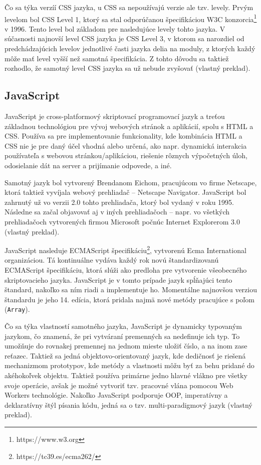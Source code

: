 Čo sa týka verzíí CSS jazyka, u CSS sa nepoužívajú verzie ale tzv. levely. Prvým levelom bol CSS Level 1, ktorý sa stal odporúčanou špecifikáciou W3C konzorcia\footnote{https://www.w3.org} v 1996. Tento level bol základom pre nasledujúce levely tohto jazyka. V súčasnosti najnovší level CSS jazyka je CSS Level 3, v ktorom sa narozdiel od predchádzajúcich levelov jednotlivé časti jazyka delia na moduly, z ktorých každý môže mať level vyšší než samotná špecifikácia. Z tohto dôvodu sa taktiež rozhodlo, že samotný level CSS jazyka sa už nebude zvyšovať \cite{about_css} (vlastný preklad).

\subsection {JavaScript}
JavaScript je cross-platformový skriptovací programovací jazyk a treťou základnou technológiou pre vývoj webových stránok a aplikácií, spolu s HTML a CSS. Používa sa pre implementovanie funkcionality, kde kombinácia HTML a CSS nie je pre daný účel vhodná alebo určená, ako napr. dynamická interakcia používateľa s webovou stránkou/aplikáciou, riešenie rôznych výpočetných úloh, odosielanie dát na server a prijímanie odpovede, a iné.

Samotný jazyk bol vytvorený Brendanom Eichom, pracujúcom vo firme Netscape, ktorá taktiež vyvíjala webový prehliadač -- Netscape Navigator. JavaScript bol zahrnutý už vo verzii 2.0 tohto prehliadača, ktorý bol vydaný v roku 1995. Následne sa začal objavovať aj v iných prehliadačoch -- napr. vo všetkých prehliadačoch vytvorených firmou Microsoft počnúc Internet Explorerom 3.0 \cite{ecmascript_specification} (vlastný preklad). 

JavaScript nasleduje ECMAScript špecifikáciu\footnote{https://tc39.es/ecma262/}, vytvorenú Ecma International organizáciou. Tá kontinuálne vydáva každý rok novú štandardizovanú ECMAScript špecifikáciu, ktorá slúži ako predloha pre vytvorenie všeobecného skriptovacieho jazyka. JavaScript je v tomto prípade jazyk spĺňajúci tento štandard, nakoľko sa ním riadi a implementuje ho. Momentálne najnovšou verziou štandardu je jeho 14. edícia, ktorá pridala najmä nové metódy pracujúce s poľom (\texttt{Array}).

Čo sa týka vlastností samotného jazyka, JavaScript je dynamicky typovaným jazykom, čo znamená, že pri vytváraní premenných sa nedefinuje ich typ. To umožňuje do rovnakej premennej na jednom mieste uložiť číslo, a na inom zase reťazec. Taktiež sa jedná objektovo-orientovaný jazyk, kde dedičnosť je riešená mechanizmom prototypov, kde metódy a vlastnosti môžu byť za behu pridané do akéhokoľvek objektu. Taktiež používa primárne jedno hlavné vlákno pre všetky svoje operácie, avšak je možné vytvoriť tzv. pracovné vlána pomocou Web Workers technológie. Nakoľko JavaScript podporuje OOP, imperatívny a deklaratívny štýl písania kódu, jedná sa o tzv. multi-paradigmový jazyk \cite{ecmascript_specification} (vlastný preklad).

